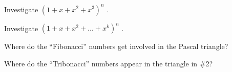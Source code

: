 \documentclass[10pt,]{book}
\theoremstyle{plain}
\theoremstyle{definition}
\theoremstyle{definition}
\theoremstyle{definition}
\theoremstyle{definition}
\numberwithin{equation}{chapter}
\begin{document}
\begin{divisionexercise}{5}\hypertarget{exercise-152}{}
\hypertarget{p-1213}{}%
Investigate \(\left( 1 + x + x^{2} + x^{3} \right)^{n}\) .%
\end{divisionexercise}%
\begin{divisionexercise}{6}\hypertarget{exercise-153}{}
\hypertarget{p-1214}{}%
Investigate \(\left( 1 + x + x^{2} + \ldots + x^{k} \right)^{n}\) .%
\end{divisionexercise}%
\begin{divisionexercise}{7}\hypertarget{exercise-154}{}
\hypertarget{p-1215}{}%
Where do the ``Fibonacci'' numbers get involved in the Pascal triangle?%
\end{divisionexercise}%
\begin{divisionexercise}{8}\hypertarget{exercise-155}{}
\hypertarget{p-1216}{}%
Where do the ``Tribonacci'' numbers appear in the triangle in \#2?%
\end{divisionexercise}%
\typeout{************************************************}
\typeout{************************************************}
\end{document}
